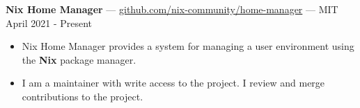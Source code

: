 \documentclass[10pt,letterpaper]{article}
\begin{document}
\textbf{Nix Home Manager} ---
\href{https://github.com/nix-community/home-manager}{github.com/nix-community/home-manager}
--- MIT \hfill April 2021 - Present
\begin{itemize}
    \item Nix Home Manager provides a system for managing a user environment
        using the \textbf{Nix} package manager.
    \item I am a maintainer with write access to the project. I review and merge
        contributions to the project.
\end{itemize}



\end{document}

